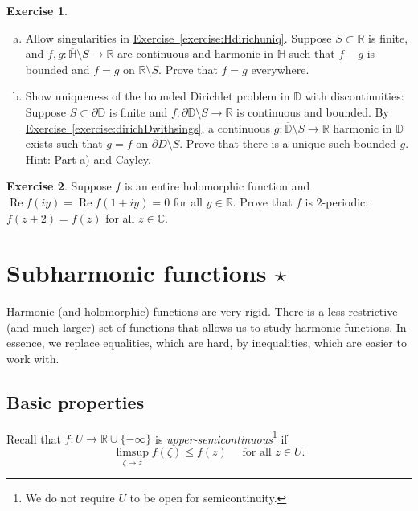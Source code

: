 \documentclass[12pt,openany]{book}
\renewcommand{\Re}{\operatorname{Re}}
\newcommand{\C}{{\mathbb{C}}}
\newcommand{\R}{{\mathbb{R}}}
\newcommand{\D}{{\mathbb{D}}}
\newcommand{\bH}{{\mathbb{H}}}
\newcommand{\myindex}[1]{#1\index{#1}}
\theoremstyle{plain}
\theoremstyle{remark}
\theoremstyle{definition}
\newenvironment{exbox}{%
    \def\FrameCommand{\vrule width 1pt \relax\hspace{10pt}}%
    \MakeFramed{\advance\hsize-\width\FrameRestore}%
}{%
    \endMakeFramed
}
\newenvironment{exparts}{%
    \leavevmode\begin{enumerate}[a),noitemsep,topsep=0pt,parsep=0pt,partopsep=0pt]
}{%
    \end{enumerate}
}
\theoremstyle{exercise}
\newtheorem{exercise}{Exercise}[section]
\theoremstyle{example}
\newcommand{\exerciseref}[1]{\hyperref[#1]{Exercise~\ref*{#1}}}
\begin{document}
\begin{exbox}
\begin{exercise}
\begin{exparts}
\item
Allow singularities in \exerciseref{exercise:Hdirichuniq}.
Suppose $S \subset \R$ is finite, and
$f,g \colon \overline{\bH} \setminus S \to \R$ are 
continuous and harmonic in $\bH$ such that $f-g$ is bounded and
$f=g$ on $\R \setminus S$.  Prove that $f=g$ everywhere.
\item
Show uniqueness of the bounded Dirichlet problem in $\D$ with
discontinuities:  Suppose $S \subset \partial \D$ is finite and
$f \colon \partial \D \setminus S \to \R$ is continuous and bounded.
By \exerciseref{exercise:dirichDwithsings}, a continuous $g \colon
\overline{\D} \setminus S \to \R$ harmonic in $\D$ exists such that $g=f$ on
$\partial D \setminus S$.  Prove that there is a unique such bounded $g$.
Hint: Part a) and Cayley.
\end{exparts}
\end{exercise}

\begin{exercise}
Suppose $f$ is an entire holomorphic function and
$\Re f(iy) = \Re f(1+iy) = 0$ for all $y \in \R$.  Prove
that $f$ is $2$-periodic: $f(z+2)=f(z)$ for all $z \in \C$.
\end{exercise}
\end{exbox}



\section{Subharmonic functions \texorpdfstring{$\star$}{*}}
\label{sec:subharmonic}

Harmonic (and holomorphic) functions are very rigid.
There is a less restrictive (and much larger) set of functions that allows
us to study harmonic functions.  In essence, we replace equalities, which are
hard, by inequalities, which are easier to work with.

\subsection{Basic properties}

Recall that $f \colon U \to \R \cup \{ -\infty \}$
is \emph{\myindex{upper-semicontinuous}}\footnote{%
We do not require $U$ to be open for semicontinuity.}
if 
\begin{equation*}
\limsup_{\zeta \to z} f(\zeta) \leq f(z) \quad \text{ for all } z \in U.
\end{equation*}
\end{document}
